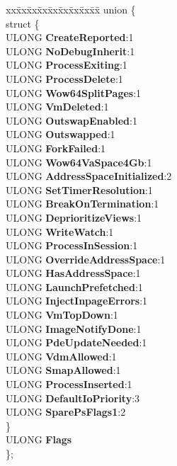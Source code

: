 \begin{DoxyCompactItemize}
\begin{tabbing}
\end{tabbing}\item 
\mbox{\label{struct___e_p_r_o_c_e_s_s_adf922be472571ea1f6ac8bd067e19058}} 
\begin{tabbing}
xx\=xx\=xx\=xx\=xx\=xx\=xx\=xx\=xx\=\kill
union \{\\
\mbox{\label{union___e_p_r_o_c_e_s_s_1_1_0D2235_a1788bfd8938441dfafbe905ef19eb7d6}} 
\>struct \{\\
\>\>ULONG {\bfseries CreateReported}:1\\
\>\>ULONG {\bfseries NoDebugInherit}:1\\
\>\>ULONG {\bfseries ProcessExiting}:1\\
\>\>ULONG {\bfseries ProcessDelete}:1\\
\>\>ULONG {\bfseries Wow64SplitPages}:1\\
\>\>ULONG {\bfseries VmDeleted}:1\\
\>\>ULONG {\bfseries OutswapEnabled}:1\\
\>\>ULONG {\bfseries Outswapped}:1\\
\>\>ULONG {\bfseries ForkFailed}:1\\
\>\>ULONG {\bfseries Wow64VaSpace4Gb}:1\\
\>\>ULONG {\bfseries AddressSpaceInitialized}:2\\
\>\>ULONG {\bfseries SetTimerResolution}:1\\
\>\>ULONG {\bfseries BreakOnTermination}:1\\
\>\>ULONG {\bfseries DeprioritizeViews}:1\\
\>\>ULONG {\bfseries WriteWatch}:1\\
\>\>ULONG {\bfseries ProcessInSession}:1\\
\>\>ULONG {\bfseries OverrideAddressSpace}:1\\
\>\>ULONG {\bfseries HasAddressSpace}:1\\
\>\>ULONG {\bfseries LaunchPrefetched}:1\\
\>\>ULONG {\bfseries InjectInpageErrors}:1\\
\>\>ULONG {\bfseries VmTopDown}:1\\
\>\>ULONG {\bfseries ImageNotifyDone}:1\\
\>\>ULONG {\bfseries PdeUpdateNeeded}:1\\
\>\>ULONG {\bfseries VdmAllowed}:1\\
\>\>ULONG {\bfseries SmapAllowed}:1\\
\>\>ULONG {\bfseries ProcessInserted}:1\\
\>\>ULONG {\bfseries DefaultIoPriority}:3\\
\>\>ULONG {\bfseries SparePsFlags1}:2\\
\>\} \\
\>ULONG {\bfseries Flags}\\
\}; \\


\end{tabbing}
\end{DoxyCompactItemize}
